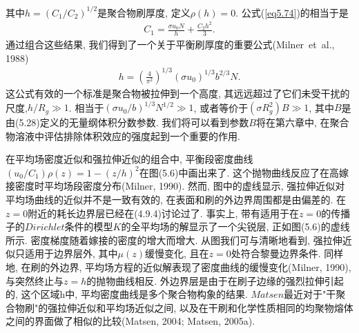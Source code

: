 其中$h=(C_{1}/C_{2})^{1/2}$是聚合物刷厚度, 定义$\rho(h)=0$.
公式(\ref{eq5.74})的相当于是
\label{subsec.equations}
    \begin{equation}
        \begin{aligned}
            C_{1}=\frac{\sigma u_{0}N}{h}+\frac{C_{2}h^{2}}{3}.
        \end{aligned}
        \label{eq5.75}
    \end{equation}
通过组合这些结果, 我们得到了一个关于平衡刷厚度的重要公式(Milner\ et\ al., 1988)
\label{subsec.equations}
    \begin{equation}
        \begin{aligned}
            h=(\frac{4}{\pi^{2}})^{1/3}(\sigma u_{0})^{1/3}b^{2/3}N.
        \end{aligned}
        \label{eq5.76}
    \end{equation}
这公式有效的一个标准是聚合物被拉伸到一个高度,
其远远超过了它们未受干扰的尺度,$h/R_{g}\gg 1$. 相当于$(\sigma
u_{0}/b)^{1/3}N^{1/2}\gg 1$, 或者等价于$(\sigma R^{2}_{g})B\gg 1$,
其中$B$是由(5.28)定义的无量纲体积分数参数.
我们将可以看到参数$B$将在第六章中, 在聚合物溶液中评估排除体积效应的强度起到一个重要的作用. 
\par
在平均场密度近似和强拉伸近似的组合中,
平衡段密度曲线$(u_{0}/C_{1})\rho(z)=1-(z/h)^{2}$在图(5.6)中画出来了.
这个抛物曲线反应了在高嫁接密度时平均场段密度分布(Milner, 1990). 然而,
图中的虚线显示, 强拉伸近似对平均场曲线的近似并不是一致有效的,
在表面和刷的外边界周围都是由偏差的.
在$z=0$附近的耗长边界层已经在(4.9.4)讨论过了. 事实上,
带有适用于在$z=0$的传播子的$Dirichlet$条件的模型$K$的全平均场的解显示了一个尖锐层,
正如图(5.6)的虚线所示. 密度梯度随着嫁接的密度的增大而增大.
从图我们可与清晰地看到, 强拉伸近似只适用于边界层外, 其中$\mu(z)$缓慢变化,
且在$z=0$处符合黎曼边界条件. 同样地, 在刷的外边界,
平均场方程的近似解表现了密度曲线的缓慢变化(Milner, 1990),
与突然终止与$z=h$的抛物曲线相反. 外边界层是由于在刷子边缘的强烈拉伸引起的,
这个区域h中, 平均密度曲线是多个聚合物构象的结果.
$Matsen$最近对于"干聚合物刷"的强拉伸近似和平均场近似之间,
以及在干刷和化学性质相同的均聚物熔体之间的界面做了相似的比较(Matsen, 2004;
Matsen, 2005a).


